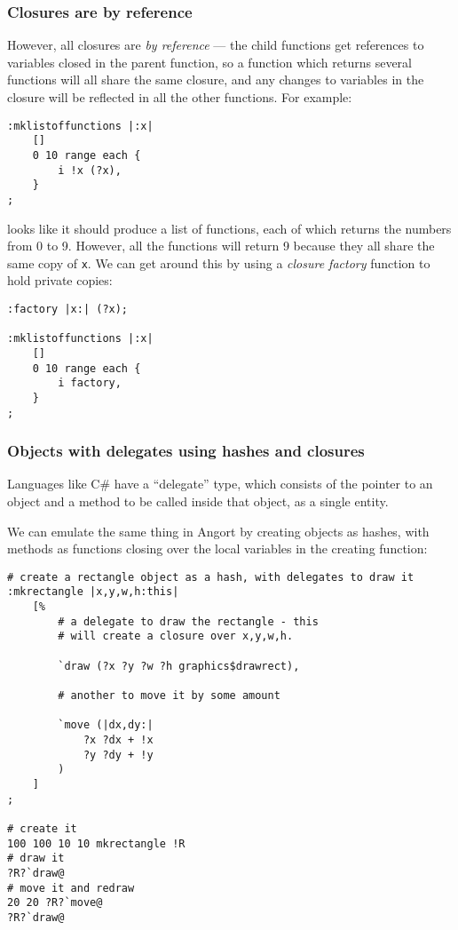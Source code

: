\subsubsection{Closures are by reference}
However, all closures are \emph{by reference} --- the child functions
get references to variables closed in the parent function, so a function
which returns several functions will all share the same closure, and
any changes to variables in the closure will be reflected in all the 
other functions. For example:
\begin{lstlisting}
:mklistoffunctions |:x|
    []
    0 10 range each {
        i !x (?x),
    }
;
\end{lstlisting}
looks like it should produce a list of functions, each of which
returns the numbers from 0 to 9. However, all the functions will
return 9 because they all share the same copy of \texttt{x}.
We can get around this by using a \emph{closure factory} function to hold
private copies:
\begin{lstlisting}
:factory |x:| (?x);

:mklistoffunctions |:x|
    []
    0 10 range each {
        i factory,
    }
;

\end{lstlisting}

\subsubsection{Objects with delegates using hashes and closures}
Languages like C\# have a ``delegate'' type, which consists of
the pointer to an object and a method to be called inside that
object, as a single entity. 

We can emulate the same thing in Angort by creating objects as
hashes, with methods as functions closing over the local variables
in the creating function:

\begin{lstlisting}
# create a rectangle object as a hash, with delegates to draw it
:mkrectangle |x,y,w,h:this|
    [%
        # a delegate to draw the rectangle - this
        # will create a closure over x,y,w,h.
        
        `draw (?x ?y ?w ?h graphics$drawrect),
        
        # another to move it by some amount
        
        `move (|dx,dy:| 
            ?x ?dx + !x
            ?y ?dy + !y
        )
    ]
;   

# create it
100 100 10 10 mkrectangle !R
# draw it
?R?`draw@
# move it and redraw
20 20 ?R?`move@
?R?`draw@
\end{lstlisting}




